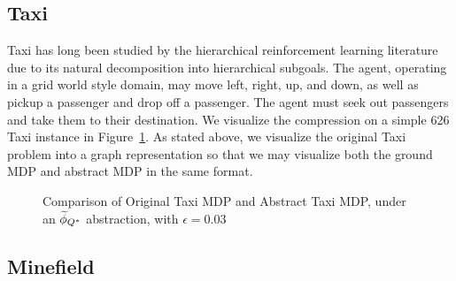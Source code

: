 \subsection{Taxi}

Taxi has long been studied by the hierarchical reinforcement learning literature due to its natural decomposition into hierarchical subgoals. The agent, operating in a grid world style domain, may move left, right, up, and down, as well as pickup a passenger and drop off a passenger. The agent must seek out passengers and take them to their destination. We visualize the compression on a simple 626 Taxi instance in Figure~\ref{fig:taxi-visual}. As stated above, we visualize the original Taxi problem into a graph representation so that we may visualize both the ground MDP and abstract MDP in the same format.

\begin{figure}[h]
\label{fig:taxi-visual}
\caption{Comparison of Original Taxi MDP and Abstract Taxi MDP, under an $\widetilde \phi_{Q^*}$ abstraction, with $\epsilon=0.03$}
\end{figure} 




\subsection{Minefield}

